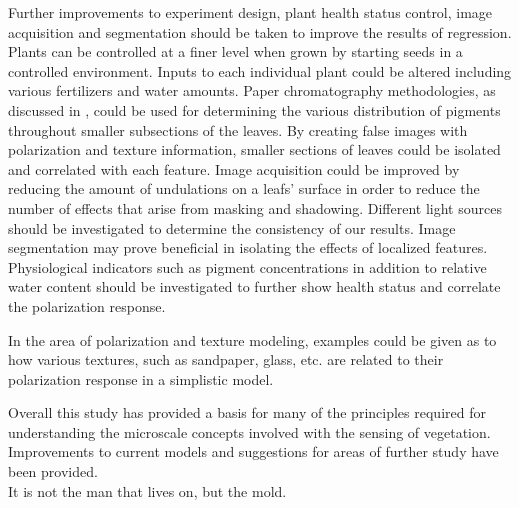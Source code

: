 Further improvements to experiment design, plant health status control, image acquisition and segmentation should be taken to improve the results of regression.  Plants can be controlled at a finer level when grown by starting seeds in a controlled environment.  Inputs to each individual plant could be altered including various fertilizers and water amounts.  Paper chromatography methodologies, as discussed in \cite{pigments}, could be used for determining the various distribution of pigments throughout smaller subsections of the leaves.  By creating false images with polarization and texture information, smaller sections of leaves could be isolated and correlated with each feature.  Image acquisition could be improved by reducing the amount of undulations on a leafs' surface in order to reduce the number of effects that arise from masking and shadowing.  Different light sources should be investigated to determine the consistency of our results.  Image segmentation may prove beneficial in isolating the effects of localized features.  Physiological indicators such as pigment concentrations in addition to relative water content should be investigated to further show health status and correlate the polarization response.

In the area of polarization and texture modeling, examples could be given as to how various textures, such as sandpaper, glass, etc. are related to their polarization response in a simplistic model.

Overall this study has provided a basis for many of the principles required for understanding the microscale concepts involved with the sensing of vegetation. Improvements to current models and suggestions for areas of further study have been provided.
\\
It is not the man that lives on, but the mold.
